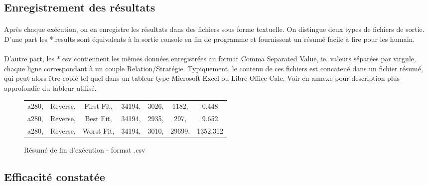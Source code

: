 \documentclass[a4paper,10pt]{report}
\begin{document}
\subsection{Enregistrement des résultats}

\paragraph{}
  Après chaque exécution, on en enregistre les résultats dans des fichiers sous forme textuelle. On distingue deux
types de fichiers de sortie. D'une part les *.results sont équivalents à la sortie console en fin de programme et
fournissent un résumé facile à lire pour les humain.
\paragraph{}
  D'autre part, les *.csv contiennent les mêmes données enregistrées au format Comma Separated Value, ie. valeurs
séparées par virgule, chaque ligne correspondant à un couple Relation/Stratégie. Typiquement, le contenu de ces 
fichiers est concatené dans un fichier résumé, qui peut alors être copié tel quel dans un tableur type Microsoft
Excel ou Libre Office Calc. Voir en annexe pour description plus approfondie du tableur utilisé.

\begin{figure}[h]
  \begin{tabular}{ccccccc}
    a280, &Reverse, &First Fit, &34194, &3026, &1182, &0.448\\
    a280, &Reverse, &Best Fit,  &34194, &2935, &297,  &9.652\\
    a280, &Reverse, &Worst Fit, &34194, &3010, &29699,&1352.312\\
  \end{tabular}
  \label{a280-sample-csv}
  \caption{Résumé de fin d'exécution - format .csv}
\end{figure}


\subsection{Efficacité constatée}
\end{document}
